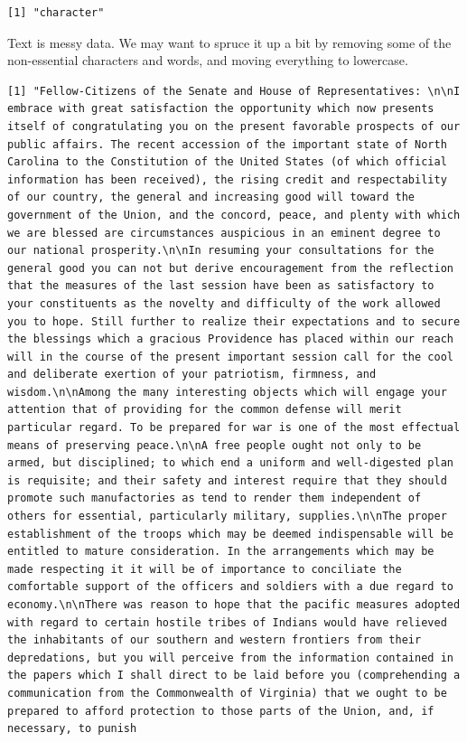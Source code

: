 \documentclass[
  letterpaper,
  DIV=11,
  numbers=noendperiod]{scrreprt}
\newenvironment{Shaded}{\begin{snugshade}}{\end{snugshade}}
\newcommand{\DecValTok}[1]{\textcolor[rgb]{0.68,0.00,0.00}{#1}}
\newcommand{\DocumentationTok}[1]{\textcolor[rgb]{0.37,0.37,0.37}{\textit{#1}}}
\newcommand{\NormalTok}[1]{\textcolor[rgb]{0.00,0.23,0.31}{#1}}
\newcommand{\SpecialCharTok}[1]{\textcolor[rgb]{0.37,0.37,0.37}{#1}}
\begin{document}
\begin{verbatim}
[1] "character"
\end{verbatim}

Text is messy data. We may want to spruce it up a bit by removing some
of the non-essential characters and words, and moving everything to
lowercase.

\begin{Shaded}
\end{Shaded}

\begin{verbatim}
[1] "Fellow-Citizens of the Senate and House of Representatives: \n\nI embrace with great satisfaction the opportunity which now presents itself of congratulating you on the present favorable prospects of our public affairs. The recent accession of the important state of North Carolina to the Constitution of the United States (of which official information has been received), the rising credit and respectability of our country, the general and increasing good will toward the government of the Union, and the concord, peace, and plenty with which we are blessed are circumstances auspicious in an eminent degree to our national prosperity.\n\nIn resuming your consultations for the general good you can not but derive encouragement from the reflection that the measures of the last session have been as satisfactory to your constituents as the novelty and difficulty of the work allowed you to hope. Still further to realize their expectations and to secure the blessings which a gracious Providence has placed within our reach will in the course of the present important session call for the cool and deliberate exertion of your patriotism, firmness, and wisdom.\n\nAmong the many interesting objects which will engage your attention that of providing for the common defense will merit particular regard. To be prepared for war is one of the most effectual means of preserving peace.\n\nA free people ought not only to be armed, but disciplined; to which end a uniform and well-digested plan is requisite; and their safety and interest require that they should promote such manufactories as tend to render them independent of others for essential, particularly military, supplies.\n\nThe proper establishment of the troops which may be deemed indispensable will be entitled to mature consideration. In the arrangements which may be made respecting it it will be of importance to conciliate the comfortable support of the officers and soldiers with a due regard to economy.\n\nThere was reason to hope that the pacific measures adopted with regard to certain hostile tribes of Indians would have relieved the inhabitants of our southern and western frontiers from their depredations, but you will perceive from the information contained in the papers which I shall direct to be laid before you (comprehending a communication from the Commonwealth of Virginia) that we ought to be prepared to afford protection to those parts of the Union, and, if necessary, to punish 
\end{verbatim}
\end{document}

